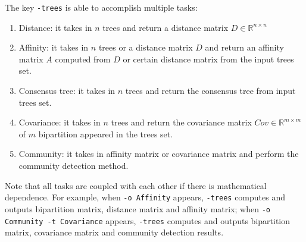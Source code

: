 \documentclass[11pt,a4paper]{article}
\theoremstyle{definition}
\theoremstyle{definition}
\numberwithin{equation}{section}
\begin{document}
	The key \texttt{-trees} is able to accomplish multiple tasks:
	\begin{enumerate}
		\item Distance: it takes in $n$ trees and return a distance matrix $D\in \mathbb{R}^{n \times n}$
		\item Affinity: it takes in $n$ trees or a distance matrix $D$ and return an affinity matrix $A$ computed from $D$ or certain distance matrix from the input trees set.
		\item Consensus tree: it takes in $n$ trees and return the consensus tree from input trees set.
		\item Covariance: it takes in $n$ trees and return the covariance matrix $Cov\in \mathbb{R}^{m\times m}$ of $m$ bipartition appeared in the trees set.
		\item Community: it takes in affinity matrix or covariance matrix and perform the community detection method.
	\end{enumerate}

	Note that all tasks are coupled with each other if there is mathematical dependence. For example, when \texttt{-o Affinity} appears, \texttt{-trees} computes and outputs bipartition matrix, distance matrix and affinity matrix; when \texttt{-o Community -t Covariance} appears, \texttt{-trees} computes and outputs bipartition matrix, covariance matrix and community detection results.
	
\end{document}
